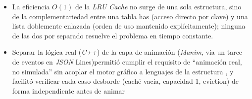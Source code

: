 \documentclass[a4paper, table]{article}
\begin{document}
\begin{itemize}
    \item La eficiencia $O(1)$ de la \textit{LRU Cache} no surge de  una sola estructura, sino de la complementariedad entre una tabla has (acceso directo por clave) y una  lista doblemente enlazada (orden de uso mantenido explícitamente); ninguna de las dos por separado resuelve el problema en tiempo constante.

    \item Separar la lógica real (\textit{C++}) de la capa de animación (\textit{Manim}, vía un tarce de eventos en \textit{JSON} Lines)permitió cumplir el requisito de “animación real, no simulada” sin acoplar el motor gráfico a lenguajes de la estructura , y facilitó verificar cada caso desborde (caché vacía, capacidad 1, eviction) de forma independiente antes de animar
\end{itemize}
\end{document}
